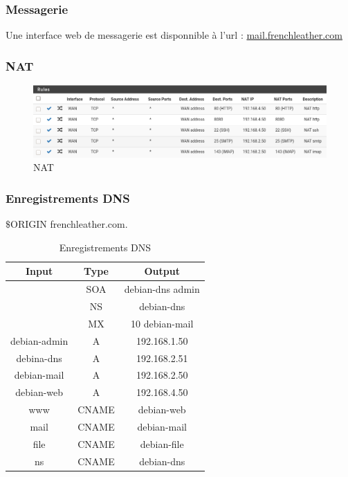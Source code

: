 \documentclass{beamer}
\begin{document}
		\begin{frame}
			\frametitle{Messagerie}
			Une interface web de messagerie est disponnible à l'url : \url{mail.frenchleather.com}
		\end{frame}
		\begin{frame}
			\frametitle{NAT}
			\begin{center}
				\begin{figure}
					\includegraphics[scale=.3]{nat.png}
					\caption{NAT}
				\end{figure}
			\end{center}
		\end{frame}
		\begin{frame}
			\frametitle{Enregistrements DNS}
			$\$$ORIGIN frenchleather.com.
			\begin{center}
				\begin{table}[h!]
					\centering
					\begin{tabular}{||c c c||}
						\hline
						Input & Type & Output \\
						\hline\hline
						 & SOA & debian-dns admin \\
						 & NS & debian-dns \\
						 & MX & 10 debian-mail \\
						debian-admin & A & 192.168.1.50 \\
						debina-dns & A & 192.168.2.51 \\
						debian-mail & A & 192.168.2.50 \\
						debian-web & A & 192.168.4.50 \\
						www & CNAME & debian-web \\
						mail & CNAME & debian-mail \\
						file & CNAME & debian-file \\
						ns & CNAME & debian-dns \\
						\hline
					\end{tabular}
					\caption{Enregistrements DNS}
					\label{table:1}
					\end{table}
			\end{center}
		\end{frame}
\end{document}
